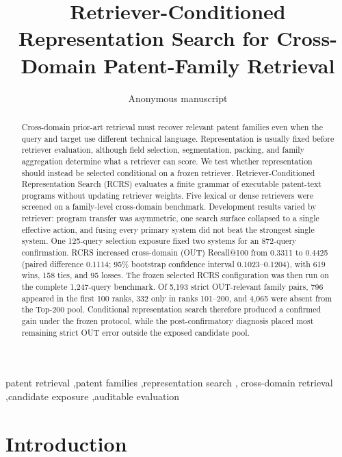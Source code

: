 \documentclass[final,5p,times,twocolumn]{elsarticle}
\newcommand{\RCRS}{RCRS}
\begin{document}
\begin{frontmatter}

\title{Retriever-Conditioned Representation Search for Cross-Domain Patent-Family Retrieval}

\author{Anonymous manuscript}

\begin{abstract}
Cross-domain prior-art retrieval must recover relevant patent families even
when the query and target use different technical language. Representation is
usually fixed before retriever evaluation, although field selection,
segmentation, packing, and family aggregation determine what a retriever can
score. We test whether representation should instead be selected conditional
on a frozen retriever. Retriever-Conditioned Representation Search (\RCRS{})
evaluates a finite grammar of executable patent-text programs without updating
retriever weights. Five lexical or dense retrievers were screened on a
family-level cross-domain benchmark. Development results varied by retriever:
program transfer was asymmetric, one search surface collapsed to a single
effective action, and fusing every primary system did not beat the strongest
single system. One 125-query selection exposure fixed two systems for an
872-query confirmation. \RCRS{} increased cross-domain (OUT) Recall@100 from 0.3311 to
0.4425 (paired difference 0.1114; 95\% bootstrap confidence interval
0.1023--0.1204), with 619 wins, 158 ties, and 95 losses. The frozen selected RCRS configuration was
then run on the complete 1,247-query benchmark. Of 5,193 strict OUT-relevant
family pairs, 796 appeared in the first 100 ranks, 332 only in ranks 101--200,
and 4,065 were absent from the Top-200 pool. Conditional representation search
therefore produced a confirmed gain under the frozen protocol, while the
post-confirmatory diagnosis placed most remaining strict OUT error outside the
exposed candidate pool.
\end{abstract}

\begin{keyword}
patent retrieval \sep patent families \sep representation search \sep
cross-domain retrieval \sep candidate exposure \sep auditable evaluation
\end{keyword}

\end{frontmatter}

\section{Introduction}
\end{document}
